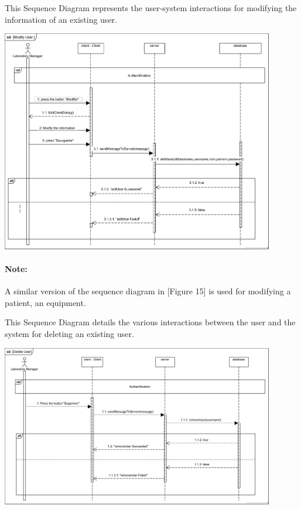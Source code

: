 \documentclass{article}
\begin{document}
\newpage
This Sequence Diagram represents the user-system interactions for modifying the information of an existing user.

\begin{center}
    \includegraphics[width=451px]{media/sequence diagrams/Modify User.png}
\end{center}

\paragraph*{\textbf{Note: }} A similar version of the sequence diagram in [Figure 15] is used for modifying a patient, an equipment.

\newpage
This Sequence Diagram details the various interactions between the user and the system for deleting an existing user.

\begin{center}
    \includegraphics[width=451px]{media/sequence diagrams/Delete User.png}
\end{center}
\end{document}
